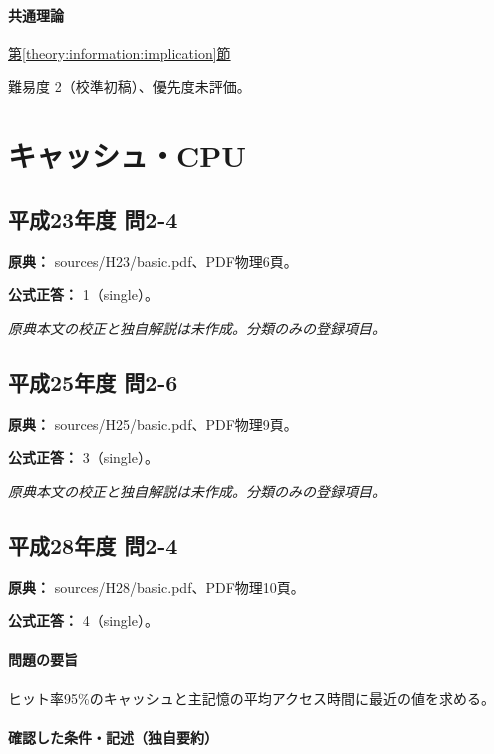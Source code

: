 \paragraph{共通理論} \hyperref[theory:information:implication]{第\ref*{theory:information:implication}節}

\par 難易度 2（校準初稿）、優先度未評価。

\section{キャッシュ・CPU}

\subsection{平成23年度 問2-4}
\label{q:h23-reg-basic-2-4}

\noindent\textbf{原典：} sources/H23/basic.pdf、PDF物理6頁。

\textbf{公式正答：} 1（single）。

\par\textit{原典本文の校正と独自解説は未作成。分類のみの登録項目。}

\subsection{平成25年度 問2-6}
\label{q:h25-reg-basic-2-6}

\noindent\textbf{原典：} sources/H25/basic.pdf、PDF物理9頁。

\textbf{公式正答：} 3（single）。

\par\textit{原典本文の校正と独自解説は未作成。分類のみの登録項目。}

\subsection{平成28年度 問2-4}
\label{q:h28-reg-basic-2-4}

\noindent\textbf{原典：} sources/H28/basic.pdf、PDF物理10頁。

\textbf{公式正答：} 4（single）。

\paragraph{問題の要旨} ヒット率95\%のキャッシュと主記憶の平均アクセス時間に最近の値を求める。

\paragraph{確認した条件・記述（独自要約）}\mbox{}\par

